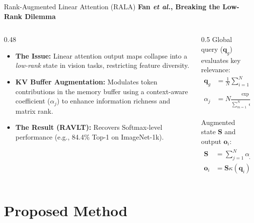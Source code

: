 \documentclass{beamer}
\makeatletter
\newcommand{\eg}{e.g.\@\xspace}
\newcommand{\etal}{\textit{et al.}\@\xspace}
\makeatother
\begin{document}
\begin{frame}{Rank-Augmented Linear Attention (RALA)}
	\textbf{Fan \etal, Breaking the Low-Rank Dilemma}
	\vspace{0.2cm}

	\begin{columns}[T]
		\begin{column}{0.48\textwidth}
			\begin{itemize}
				\item \textbf{The Issue:} Linear attention output maps collapse into a \textit{low-rank} state in vision tasks, restricting feature diversity.
				\item \textbf{KV Buffer Augmentation:} Modulates token contributions in the memory buffer using a context-aware coefficient ($\alpha_j$) to enhance information richness and matrix rank.
				\item \textbf{The Result (RAVLT):} Recovers Softmax-level performance (\eg, 84.4\% Top-1 on ImageNet-1k).
			\end{itemize}
		\end{column}

		\begin{column}{0.5\textwidth}
			Global query ($\mathbf{q}_g$) evaluates key relevance:
			\vspace{-0.2cm}
			\begin{align*}
				\mathbf{q}_{g} & = \frac{1}{N} \sum_{i=1}^N \mathbf{q}_i                                                                                \\
				\alpha_j       & = N \frac{\exp(\mathbf{q}_{g}^\top \kappa(\mathbf{k}_j))}{\sum_{m=1}^N \exp(\mathbf{q}_{g}^\top \kappa(\mathbf{k}_m))}
			\end{align*}

			Augmented state $\mathbf{S}$ and output $\mathbf{o}_i$:
			\vspace{-0.2cm}
			\begin{align*}
				\mathbf{S}   & = \sum_{j=1}^N \alpha_j \mathbf{v}_j \kappa(\mathbf{k}_j)^\top \\
				\mathbf{o}_i & = \mathbf{S} \kappa(\mathbf{q}_i)
			\end{align*}
		\end{column}
	\end{columns}
\end{frame}


\section{Proposed Method}
\end{document}
